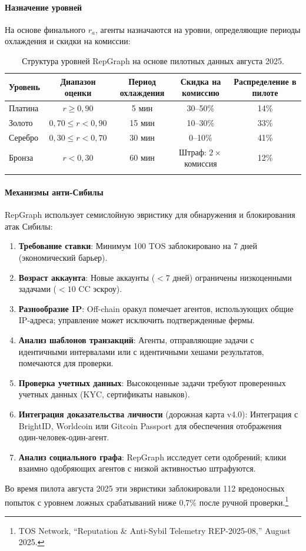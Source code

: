\documentclass[11pt]{article}
\begin{document}
\paragraph{Назначение уровней} На основе финального $r_a$, агенты назначаются на уровни, определяющие периоды охлаждения и скидки на комиссии:
\begin{longtable}{@{}lcccc@{}}
\toprule
\textbf{Уровень} & \textbf{Диапазон оценки} & \textbf{Период охлаждения} & \textbf{Скидка на комиссию} & \textbf{Распределение в пилоте} \\\midrule
Платина & $r \geq 0,90$ & 5 мин & 30--50\% & 14\% \\
Золото & $0,70 \leq r < 0,90$ & 15 мин & 10--30\% & 33\% \\
Серебро & $0,30 \leq r < 0,70$ & 30 мин & 0--10\% & 41\% \\
Бронза & $r < 0,30$ & 60 мин & Штраф: $2 \times$ комиссия & 12\% \\\bottomrule
\caption{Структура уровней RepGraph на основе пилотных данных августа 2025.}
\label{tab:reputation-tiers}
\end{longtable}

\paragraph{Механизмы анти-Сибилы} RepGraph использует семислойную эвристику для обнаружения и блокирования атак Сибилы:
\begin{enumerate}[noitemsep]
  \item \textbf{Требование ставки}: Минимум 100 TOS заблокировано на 7 дней (экономический барьер).
  \item \textbf{Возраст аккаунта}: Новые аккаунты ($<7$ дней) ограничены низкоценными задачами ($<10$ CC эскроу).
  \item \textbf{Разнообразие IP}: Off-chain оракул помечает агентов, использующих общие IP-адреса; управление может исключить подтвержденные фермы.
  \item \textbf{Анализ шаблонов транзакций}: Агенты, отправляющие задачи с идентичными интервалами или с идентичными хешами результатов, помечаются для проверки.
  \item \textbf{Проверка учетных данных}: Высокоценные задачи требуют проверенных учетных данных (KYC, сертификаты навыков).
  \item \textbf{Интеграция доказательства личности} (дорожная карта v4.0): Интеграция с BrightID, Worldcoin или Gitcoin Passport для обеспечения отображения один-человек-один-агент.
  \item \textbf{Анализ социального графа}: RepGraph исследует сети одобрений; клики взаимно одобряющих агентов с низкой активностью штрафуются.
\end{enumerate}
Во время пилота августа 2025 эти эвристики заблокировали 112 вредоносных попыток с уровнем ложных срабатываний ниже 0,7\% после ручной проверки.\footnote{TOS Network, ``Reputation \& Anti-Sybil Telemetry REP-2025-08,'' August 2025.}
\end{document}
